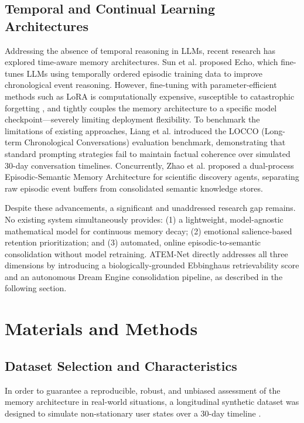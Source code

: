 \documentclass[conference]{IEEEtran}
\begin{document}
\subsection{Temporal and Continual Learning Architectures}

Addressing the absence of temporal reasoning in LLMs, recent research has explored time-aware memory architectures. Sun et al. \cite{sun} proposed Echo, which fine-tunes LLMs using temporally ordered episodic training data to improve chronological event reasoning. However, fine-tuning with parameter-efficient methods such as LoRA \cite{hu} is computationally expensive, susceptible to catastrophic forgetting \cite{shi}, and tightly couples the memory architecture to a specific model checkpoint—severely limiting deployment flexibility. To benchmark the limitations of existing approaches, Liang et al. \cite{liang} introduced the LOCCO (Long-term Chronological Conversations) evaluation benchmark, demonstrating that standard prompting strategies fail to maintain factual coherence over simulated 30-day conversation timelines. Concurrently, Zhao et al. \cite{zhao} proposed a dual-process Episodic-Semantic Memory Architecture for scientific discovery agents, separating raw episodic event buffers from consolidated semantic knowledge stores.

Despite these advancements, a significant and unaddressed research gap remains. No existing system simultaneously provides: (1) a lightweight, model-agnostic mathematical model for continuous memory decay; (2) emotional salience-based retention prioritization; and (3) automated, online episodic-to-semantic consolidation without model retraining. ATEM-Net directly addresses all three dimensions by introducing a biologically-grounded Ebbinghaus retrievability score and an autonomous Dream Engine consolidation pipeline, as described in the following section.

\section{Materials and Methods}

\subsection{Dataset Selection and Characteristics}
In order to guarantee a reproducible, robust, and unbiased assessment of the memory architecture in real-world situations, a longitudinal synthetic dataset was designed to simulate non-stationary user states over a 30-day timeline \cite{liang}.
\end{document}
